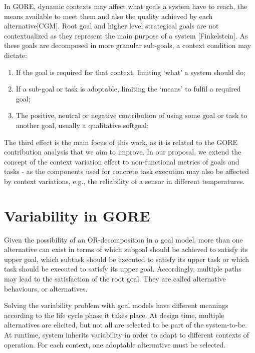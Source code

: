 In GORE, dynamic contexts may affect what goals a system have to reach, the means available to meet them and also the quality achieved by each alternative[CGM]. Root goal and higher level strategical goals are not contextualized as they represent the main purpose of a system [Finkelstein]. As these goals are decomposed in more granular sub-goals, a context condition may dictate:

\begin{enumerate}

\item If the goal is required for that context, limiting `what' a system should do;
\medskip

\item If a sub-goal or task is adoptable, limiting the `means' to fulfil a required goal;
\medskip

\item The positive, neutral or negative contribution of using some goal or task to another goal, usually a qualitative softgoal;

\end{enumerate}

The third effect is the main focus of this work, as it is related to the GORE contribution analysis that we aim to improve. In our proposal, we extend the concept of the context variation effect to non-functional metrics of goals and tasks - as the components used for concrete task execution may also be affected by context variations, e.g., the reliability of a sensor in different temperatures. 

\section{Variability in GORE}\label{sec:variability}

Given the possibility of an OR-decomposition in a goal model, more than one alternative can exist in terms of which subgoal should be achieved to satisfy its upper goal,  which subtask should be executed to satisfy its upper task or which task should be executed to satisfy its upper goal. Accordingly, multiple paths may lead to the satisfaction of the root goal. They are called alternative behaviours, or alternatives. 

Solving the variability problem with goal models have different meanings according to the life cycle phase it takes place. At design time, multiple alternatives are elicited, but not all are selected to be part of the system-to-be. At runtime, system inherits variability in order to adapt to different contexts of operation. For each context, one adoptable alternative must be selected. 

